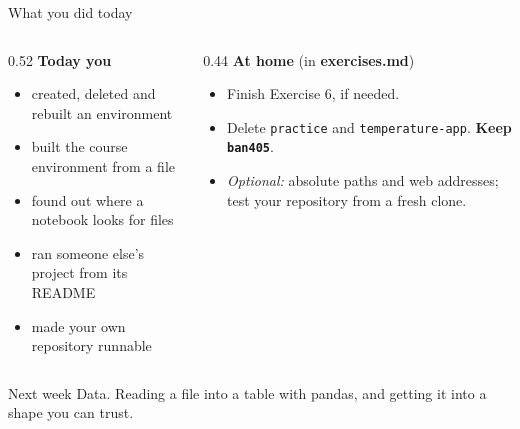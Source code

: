 \documentclass[aspectratio=169,11pt]{beamer}
\newcommand{\code}[1]{\texttt{#1}}
\newcommand{\key}[1]{\textbf{\textcolor{ban}{#1}}}
\begin{document}
\begin{frame}[t]{What you did today}
  \begin{columns}[T]
    \begin{column}{0.52\textwidth}
      \textbf{Today you}
      \footnotesize
      \begin{itemize}
        \item created, deleted and rebuilt an environment
        \item built the course environment from a file
        \item found out where a notebook looks for files
        \item ran someone else's project from its README
        \item made your own repository runnable
      \end{itemize}
    \end{column}
    \begin{column}{0.44\textwidth}
      \textbf{At home} {\small (in \key{exercises.md})}
      \footnotesize
      \begin{itemize}
        \item Finish Exercise 6, if needed.
        \item Delete \code{practice} and \code{temperature-app}. \textbf{Keep \code{ban405}}.
        \item \emph{Optional:} absolute paths and web addresses; test your repository from a fresh clone.
      \end{itemize}
    \end{column}
  \end{columns}
  \vfill
  \begin{block}{Next week}
    Data. Reading a file into a table with pandas, and getting it into a shape you can trust.
  \end{block}
\end{frame}
\end{document}
